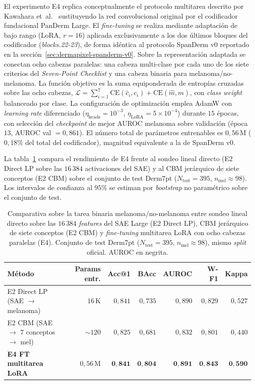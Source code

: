 El experimento E4 replica conceptualmente el protocolo multitarea
descrito por Kawahara et~al.~\cite{kawahara2019} sustituyendo la
red convolucional original por el codificador fundacional PanDerm
Large. El \emph{fine-tuning} se realiza mediante adaptación de
bajo rango (LoRA, $r = 16$) aplicada exclusivamente a los dos
últimos bloques del codificador (\emph{blocks.22-23}), de forma
idéntica al protocolo SpanDerm v0 reportado en la
secci\'on~\ref{sec:dermapixel-spanderm-v0}. Sobre la
representación adaptada se conectan ocho cabezas paralelas: una
cabeza multi-clase por cada uno de los siete criterios del
\emph{Seven-Point Checklist} y una cabeza binaria para
melanoma/no-melanoma. La función objetivo es la suma
equiponderada de entropías cruzadas sobre las ocho cabezas,
$\mathcal{L} = \sum_{i=1}^{7} \mathrm{CE}(\hat{c}_i, c_i) +
\mathrm{CE}(\hat{m}, m)$, con \emph{class weight} balanceado por
clase. La configuración de optimización emplea AdamW con
\emph{learning rate} diferenciado
($\eta_{\mathrm{heads}} = 10^{-3}$,
$\eta_{\mathrm{LoRA}} = 5 \times 10^{-4}$) durante $15$ épocas,
con selección del \emph{checkpoint} de mejor AUROC melanoma sobre
validación (época $13$, AUROC val $= 0{,}861$). El número total
de parámetros entrenables es $0{,}56$\,M ($0{,}18\%$ del total
del codificador), magnitud equivalente a la de SpanDerm v0.

La tabla~\ref{tab:sae-d7pt-e4-comp} compara el rendimiento de
E4 frente al sondeo lineal directo (E2 Direct LP sobre las
$16\,384$ activaciones del SAE) y al CBM jerárquico de siete
conceptos (E2 CBM) sobre el conjunto de test Derm7pt
($N_{\mathrm{test}} = 395$, $n_{\mathrm{mel}} \approx 98$). Los
intervalos de confianza al $95\%$ se estiman por \emph{bootstrap}
no paramétrico sobre el conjunto de test.

\begin{table}[H]
\centering
\footnotesize
\setlength{\tabcolsep}{4pt}
\renewcommand{\arraystretch}{0.95}
\caption{Comparativa sobre la tarea binaria melanoma/no-melanoma
entre sondeo lineal directo sobre las $16\,384$ \emph{features}
del SAE Large (E2 Direct LP), CBM jerárquico de siete conceptos
(E2 CBM) y \emph{fine-tuning} multitarea LoRA con ocho cabezas
paralelas (E4). Conjunto de test Derm7pt
($N_{\mathrm{test}} = 395$, $n_{\mathrm{mel}} \approx 98$), mismo
\emph{split} oficial. AUROC en negrita.}
\label{tab:sae-d7pt-e4-comp}
\begin{tabular}{lrrrrrr}
\hline
Método                                       & Params entr. & Acc@1     & BAcc      & AUROC              & W-F1      & Kappa     \\
\hline
E2 Direct LP (SAE $\to$ melanoma)             & $16$\,K       & $0{,}841$ & $0{,}735$ & $0{,}890$          & $0{,}829$ & $0{,}527$ \\
E2 CBM (SAE $\to$ $7$ conceptos $\to$ mel)    & $\sim 120$    & $0{,}825$ & $0{,}681$ & $0{,}832$          & $0{,}801$ & $0{,}440$ \\
\textbf{E4 FT multitarea LoRA}                & $0{,}56$\,M   & $\mathbf{0{,}841}$ & $\mathbf{0{,}804}$ & $\mathbf{0{,}891}$ & $\mathbf{0{,}843}$ & $\mathbf{0{,}590}$ \\
\hline
\end{tabular}
\end{table}

